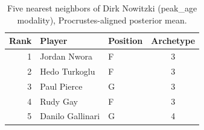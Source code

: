 \begin{table}[htbp]
  \centering\small
  \begin{tabular}{rllc}
    \toprule
    Rank & Player & Position & Archetype \\
    \midrule
    1 & Jordan Nwora & F & 3 \\
    2 & Hedo Turkoglu & F & 3 \\
    3 & Paul Pierce & G & 3 \\
    4 & Rudy Gay & F & 3 \\
    5 & Danilo Gallinari & G & 4 \\
    \bottomrule
  \end{tabular}
  \caption{Five nearest neighbors of Dirk Nowitzki (peak_age modality), Procrustes-aligned posterior mean.}
  \label{tab:Dirk_Nowitzki_neighbors_peak_age}
\end{table}

